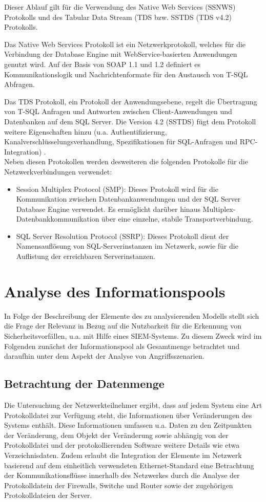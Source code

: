 Dieser Ablauf gilt für die Verwendung des Native Web Services (SSNWS) Protokolls und des Tabular Data Stream (TDS bzw. SSTDS (TDS v4.2) Protokolls. 

Das Native Web Services Protokoll ist ein Netzwerkprotokoll, welches für die Verbindung der Database Engine mit WebService-basierten Anwendungen genutzt wird. Auf der Basis von SOAP 1.1 und 1.2 definiert es Kommunikationslogik und Nachrichtenformate für den Austausch von T-SQL Abfragen. 

Das TDS Protokoll, ein Protokoll der Anwendungsebene, regelt die Übertragung von T-SQL Anfragen und Antworten zwischen Client-Anwendungen und Datenbanken auf dem SQL Server. Die Version 4.2 (SSTDS) fügt dem Protokoll weitere Eigenschaften hinzu (u.a. Authentifizierung, Kanalverschlüsselungsverhandlung, Spezifikationen für SQL-Anfragen und RPC-Integration) \citep{SQLProt1}.\\

Neben diesen Protokollen werden desweiteren die folgenden Protokolle für die Netzwerkverbindungen verwendet:
\begin{itemize}
\item Session Multiplex Protocol (SMP): Dieses Protokoll wird für die Kommunikation zwischen Datenbankanwendungen und der SQL Server Database Engine verwendet. Es ermöglicht darüber hinaus Multiplex-Datenbankkommunikation über eine einzelne, stabile Transportverbindung.
\item SQL Server Resolution Protocol (SSRP): Dieses Protokoll dient der Namensauflösung von SQL-Serverinstanzen im Netzwerk, sowie für die Auflistung der erreichbaren Serverinstanzen.
\end{itemize}
\citep{SQLProt1}


\section{Analyse des Informationspools}
In Folge der Beschreibung der Elemente des zu analysierenden Modells stellt sich die Frage der Relevanz in Bezug auf die Nutzbarkeit für die Erkennung von Sicherheitsvorfällen, u.a. mit Hilfe eines SIEM-Systems. Zu diesem Zweck wird im Folgenden zunächst der Informationspool als Gesamtmenge betrachtet und daraufhin unter dem Aspekt der Analyse von Angriffsszenarien.

\subsection{Betrachtung der Datenmenge}
Die Untersuchung der Netzwerkteilnehmer ergibt, dass auf jedem System eine Art Protokolldatei zur Verfügung steht, die Informationen über Veränderungen des Systems enthält. Diese Informationen umfassen u.a. Daten zu den Zeitpunkten der Veränderung, dem Objekt der Veränderung sowie abhängig von der Protokolldatei und der protokollierenden Software weitere Details wie etwa Verzeichnisdaten. Zudem erlaubt die Integration der Elemente im Netzwerk basierend auf dem einheitlich verwendeten Ethernet-Standard eine Betrachtung der Kommunikationsflüsse innerhalb des Netzwerkes durch die Analyse der Protokolldatein der Firewalls, Switche und Router sowie der zugehörigen Protokolldateien der Server.\\ 

